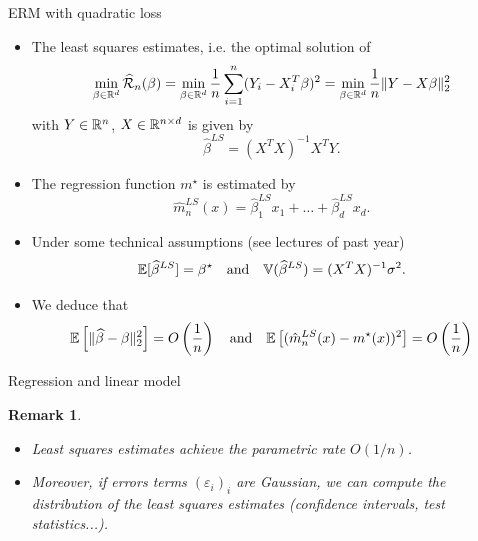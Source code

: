 \documentclass[xcolor={usenames,dvipsnames},handout]{beamer}
\newtheorem{remark}[theorem]{Remark}
\begin{document}
\begin{frame}{ERM with quadratic loss} 


\begin{itemize}
\item The least squares estimates, i.e. the optimal solution of
$$
\min_{\beta \in \mathbb{R}^d} \widehat{{\mathcal{R}}}_n (\beta) = \min_{\beta \in \mathbb{R}^d} \frac{1}{n} \sum_{i=1}^n (Y_i - X_i^T \beta)^2 =  \min_{\beta \in \mathbb{R}^d}  \frac{1}{n}\| Y - X \beta \|_2^2
$$
with $Y\in\mathbb{R}^n$, $X\in \mathbb{R}^{n\times d}$ is given by
\pause 
$$
\widehat{\beta}^{LS}  = (X^T X)^{-1} X^T Y.
$$
\item The regression function $m^\star$ is estimated by
\pause
$$
\widehat{m}_n^{LS} (x) = \hat{\beta}^{LS}_1 x_1 + \hdots + \hat{\beta}^{LS}_d x_d.
$$
\item Under some technical assumptions (see lectures of past year)
$$
\mathbb{E} [ \widehat{\beta}^{LS}  ] = \beta^\star \quad \text{and} \quad \mathbb{V} (\widehat{\beta}^{LS}   ) = (X^T X)^{-1} \sigma^2.
$$
\item We deduce that
$$
\mathbb{E} \left[ \| \widehat{\beta} - \beta \|_2^2 \right] = O \left( \frac{1}{n} \right) \quad \text{and} \quad \mathbb{E} \left[ ( \hat{m}_n^{LS}(x) - m^\star(x) )^2 \right] = O \left( \frac{1}{n} \right) 
$$
\end{itemize}
\end{frame}

\begin{frame}{Regression and linear model}
\begin{remark}  
\begin{itemize}
\item Least squares estimates achieve the parametric rate $O(1/n)$.
\item Moreover, if errors terms $(\varepsilon_i)_i$ are Gaussian, we can compute the distribution of the least squares estimates (confidence intervals, test statistics...).
\end{itemize}
\end{remark}
\end{frame}
\end{document}
